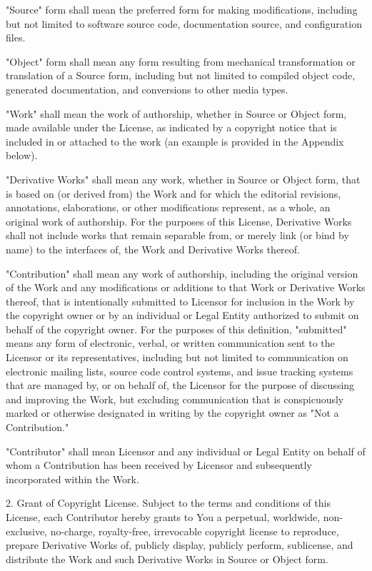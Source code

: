 \documentclass[twoside]{tceusermanual}
\begin{document}
      "Source" form shall mean the preferred form for making modifications,
      including but not limited to software source code, documentation
      source, and configuration files.

      "Object" form shall mean any form resulting from mechanical
      transformation or translation of a Source form, including but
      not limited to compiled object code, generated documentation,
      and conversions to other media types.

      "Work" shall mean the work of authorship, whether in Source or
      Object form, made available under the License, as indicated by a
      copyright notice that is included in or attached to the work
      (an example is provided in the Appendix below).

      "Derivative Works" shall mean any work, whether in Source or Object
      form, that is based on (or derived from) the Work and for which the
      editorial revisions, annotations, elaborations, or other modifications
      represent, as a whole, an original work of authorship. For the purposes
      of this License, Derivative Works shall not include works that remain
      separable from, or merely link (or bind by name) to the interfaces of,
      the Work and Derivative Works thereof.

      "Contribution" shall mean any work of authorship, including
      the original version of the Work and any modifications or additions
      to that Work or Derivative Works thereof, that is intentionally
      submitted to Licensor for inclusion in the Work by the copyright owner
      or by an individual or Legal Entity authorized to submit on behalf of
      the copyright owner. For the purposes of this definition, "submitted"
      means any form of electronic, verbal, or written communication sent
      to the Licensor or its representatives, including but not limited to
      communication on electronic mailing lists, source code control systems,
      and issue tracking systems that are managed by, or on behalf of, the
      Licensor for the purpose of discussing and improving the Work, but
      excluding communication that is conspicuously marked or otherwise
      designated in writing by the copyright owner as "Not a Contribution."

      "Contributor" shall mean Licensor and any individual or Legal Entity
      on behalf of whom a Contribution has been received by Licensor and
      subsequently incorporated within the Work.

   2. Grant of Copyright License. Subject to the terms and conditions of
      this License, each Contributor hereby grants to You a perpetual,
      worldwide, non-exclusive, no-charge, royalty-free, irrevocable
      copyright license to reproduce, prepare Derivative Works of,
      publicly display, publicly perform, sublicense, and distribute the
      Work and such Derivative Works in Source or Object form.
\end{document}

